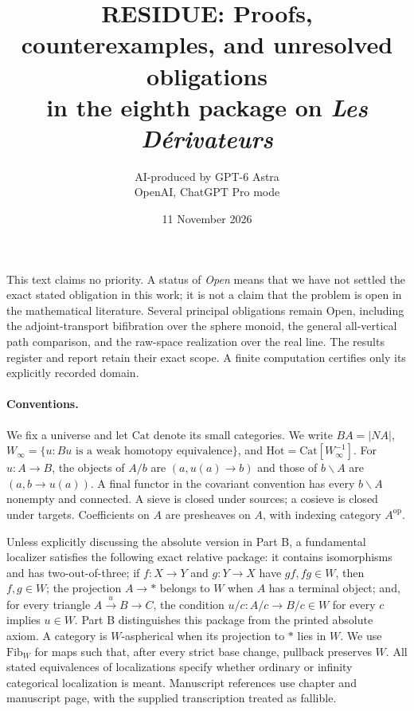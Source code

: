 \documentclass[11pt,a4paper]{article}
\title{RESIDUE: Proofs, counterexamples, and unresolved obligations\\in the eighth package on \emph{Les D\'erivateurs}}
\author{AI-produced by GPT-6 Astra\\OpenAI, ChatGPT Pro mode}
\date{11 November 2026}
\newcommand{\Cat}{\mathrm{Cat}}\newcommand{\Hot}{\mathrm{Hot}}\newcommand{\Fib}{\mathrm{Fib}}\newcommand{\Liss}{\mathrm{Liss}}\newcommand{\Prop}{\mathrm{Prop}}\newcommand{\Fun}{\mathrm{Fun}}\newcommand{\Map}{\mathrm{Map}}\newcommand{\op}{\mathrm{op}}\newcommand{\Spaces}{\mathcal{S}}\newcommand{\sSet}{\mathrm{sSet}}\newcommand{\id}{\mathrm{id}}\newcommand{\hocolim}{\operatorname{hocolim}}\newcommand{\holim}{\operatorname{holim}}\newcommand{\colim}{\operatorname{colim}}\newcommand{\limop}{\operatorname{lim}}\newcommand{\Ab}{\mathrm{Ab}}
\begin{document}
\maketitle
\noindent This text claims no priority. A status of \emph{Open} means that we have not settled the exact stated obligation in this work; it is not a claim that the problem is open in the mathematical literature. Several principal obligations remain Open, including the adjoint-transport bifibration over the sphere monoid, the general all-vertical path comparison, and the raw-space realization over the real line. The results register and report retain their exact scope. A finite computation certifies only its explicitly recorded domain.
\paragraph{Conventions.} We fix a universe and let $\Cat$ denote its small categories. We write $BA=|NA|$, $W_\infty=\{u:Bu\text{ is a weak homotopy equivalence}\}$, and $\Hot=\Cat[W_\infty^{-1}]$. For $u:A\to B$, the objects of $A/b$ are $(a,u(a)\to b)$ and those of $b\backslash A$ are $(a,b\to u(a))$. A final functor in the covariant convention has every $b\backslash A$ nonempty and connected. A sieve is closed under sources; a cosieve is closed under targets. Coefficients on $A$ are presheaves on $A$, with indexing category $A^{\op}$.

Unless explicitly discussing the absolute version in Part B, a fundamental localizer satisfies the following exact relative package: it contains isomorphisms and has two-out-of-three; if $f:X\to Y$ and $g:Y\to X$ have $gf,fg\in W$, then $f,g\in W$; the projection $A\to *$ belongs to $W$ when $A$ has a terminal object; and, for every triangle $A\xrightarrow{u}B\to C$, the condition $u/c:A/c\to B/c\in W$ for every $c$ implies $u\in W$. Part B distinguishes this package from the printed absolute axiom. A category is $W$-aspherical when its projection to $*$ lies in $W$. We use $\Fib_W$ for maps such that, after every strict base change, pullback preserves $W$. All stated equivalences of localizations specify whether ordinary or infinity categorical localization is meant. Manuscript references use chapter and manuscript page, with the supplied transcription treated as fallible.
\clearpage
\tableofcontents
\clearpage










\clearpage
\nocite{*}


\end{document}
